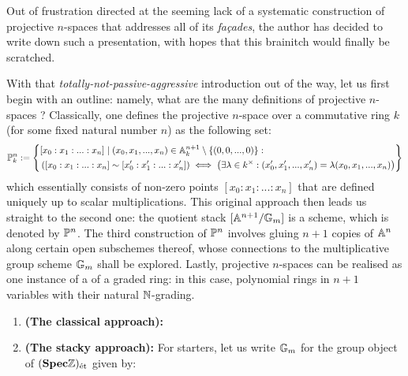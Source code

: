                     \begin{example} \label{example: projective_spaces} 
                        Out of frustration directed at the seeming lack of a systematic construction of projective $n$-spaces that addresses all of its \textit{fa\c{c}ades}, the author has decided to write down such a presentation, with hopes that this brainitch would finally be scratched. 
                        
                        With that \textit{totally-not-passive-aggressive} introduction out of the way, let us first begin with an outline: namely, what are the many definitions of projective $n$-spaces ? Classically, one defines the projective $n$-space over a commutative ring $k$ (for some fixed natural number $n$) as the following set:
                            $$
                                \P^n_k :=
                                \left\{\begin{aligned}
                                    & [x_0 : x_1 : ... : x_n] \mid (x_0, x_1, ..., x_n) \in \A^{n+1}_k \setminus \{(0, 0, ..., 0)\}:
                                    \\
                                    & \left([x_0 : x_1 : ... : x_n] \sim [x'_0 : x'_1 : ... : x'_n]\right) \iff \left(\exists \lambda \in k^{\x}: (x'_0, x'_1, ..., x'_n) = \lambda (x_0, x_1, ..., x_n)\right)
                                \end{aligned}\right\}
                            $$
                        which essentially consists of non-zero points $[x_0 : x_1 : ... : x_n]$ that are defined uniquely up to scalar multiplications. This original approach then leads us straight to the second one: the quotient stack $[\A^{n+1} / \G_m]$ is a scheme, which is denoted by $\P^n$. The third construction of $\P^n$ involves gluing $n + 1$ copies of $\A^n$ along certain open subschemes thereof, whose connections to the multiplicative group scheme $\G_m$ shall be explored. Lastly, projective $n$-spaces can be realised as one instance of a \say{$\Proj$} of a graded ring: in this case, polynomial rings in $n + 1$ variables with their natural $\N$-grading. 
                            \begin{enumerate}
                                \item \textbf{(The classical approach):} 
                                \item \textbf{(The stacky approach):} For starters, let us write $\G_m$ for the group object of $(\Spec \Z)_{\et}$ given by:

\end{enumerate}
\end{example}
